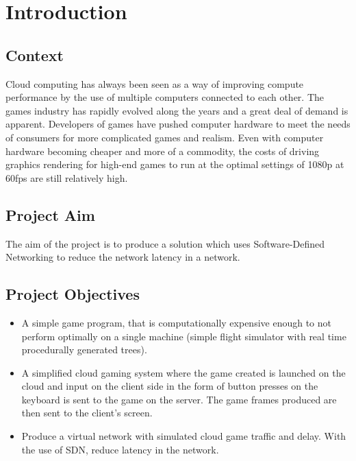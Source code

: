 \chapter{Introduction}
\label{chapter1}

\section{Context}
Cloud computing has always been seen as a way of improving compute performance by the use of multiple computers connected to each other. The games industry has rapidly evolved along the years and a great deal of demand is apparent. Developers of games have pushed computer hardware to meet the needs of consumers for more complicated games and realism. Even with computer hardware becoming cheaper and more of a commodity, the costs of driving graphics rendering for high-end games to run at the optimal settings of 1080p at 60fps are still relatively high.

\section{Project Aim}
The aim of the project is to produce a solution which uses Software-Defined Networking to reduce the network latency in a network.

\section{Project Objectives}
\begin{itemize}
  \item A simple game program, that is computationally expensive enough to not perform optimally on a single machine (simple flight simulator with real time procedurally generated trees).
  \item A simplified cloud gaming system where the game created is launched on the cloud and input on the client side in the form of button presses on the keyboard is sent to the game on the server. The game frames produced are then sent to the client's screen.
  \item Produce a virtual network with simulated cloud game traffic and delay. With the use of SDN, reduce latency in the network.
\end{itemize}

